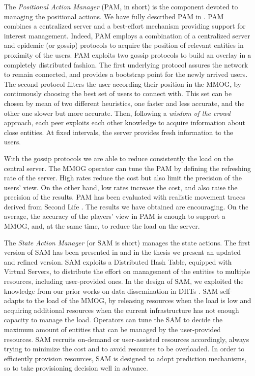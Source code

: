 \documentclass[final,10pt,a5paper]{phdimt}
\theoremstyle{definition}
\begin{document}
The \textit{Positional Action Manager} (PAM, in short) is the component devoted to managing the positional actions.
We have fully described PAM in \cite{gossipim, netgames12}.
PAM combines a centralized server and a best-effort mechanism providing support for interest management.
Indeed, PAM employs a combination of a centralized server and epidemic (or gossip) protocols to acquire the position of relevant entities in proximity of the users. PAM exploits two gossip protocols to build an overlay in a completely distributed fashion. The first underlying protocol assures the network to remain connected, and  provides a bootstrap point for the newly arrived users.
The second protocol filters the user according their position in the MMOG, by continuously choosing the best set of users to connect with. This set can be chosen by mean of two different heuristics, one faster and less accurate, and the other one slower but more accurate. Then, following a \textit{wisdom of the crowd} approach, each peer exploits each other knowledge to acquire information about close entities. At fixed intervals, the server provides fresh information to the users.

With the gossip protocols we are able to reduce consistently the load on the central server.
The MMOG operator can tune the PAM by defining the refreshing rate of the server. High rates reduce the cost but also limit the precision of the users' view. On the other hand, low rates increase the cost, and also raise the precision of the results.
PAM has been evaluated with realistic movement traces derived from Second Life \cite{sl-site}. 
The results we have obtained are encouraging. On the average, the accuracy of the players' view in PAM is enough to support a MMOG, and, at the same time, to reduce the load on the server.


The \textit{State Action Manager} (or SAM is short) manages the state actions.
The first version of SAM has been presented in \cite{pos} and in the thesis we present an updated and refined version.
SAM exploits a Distributed Hash Table, equipped with Virtual Servers, to distribute the effort on management of the entities to multiple resources, including user-provided ones.
In the design of SAM, we exploited the knowledge from our prior works on data dissemination in DHTs \cite{carlini2010reducing,carlini2011probabilistic}.
SAM self-adapts to the load of the MMOG, by releasing resources when the load is low and acquiring additional resources when the current infrastructure has not enough capacity to manage the load.
Operators can tune the SAM to decide the maximum amount of entities that can be managed by the user-provided resources. 
SAM recruits on-demand or user-assisted resources accordingly, always trying to minimize the cost and to avoid resources to be overloaded. In order to efficiently provision resources, SAM is designed to adopt prediction mechanisms, so to take provisioning decision well in advance. 
\end{document}
